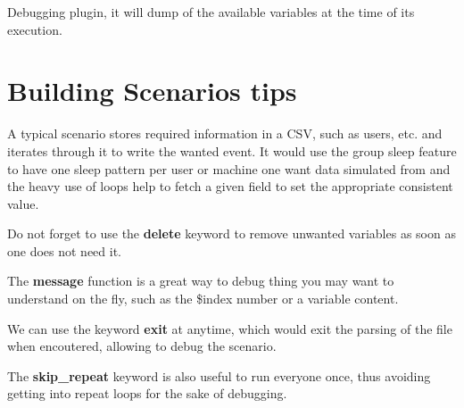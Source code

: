 \documentclass[10pt]{article}
\begin{document}
Debugging plugin, it will dump of the available variables at the time of its execution.


\section{Building Scenarios tips}

A typical scenario stores required information in a CSV, such as users, etc. and iterates through it to write the wanted event. It would use the group sleep feature to have one sleep pattern per user or machine one want data simulated from and the heavy use of loops help to fetch a given field to set the appropriate consistent value.

Do not forget to use the \textbf{delete} keyword to remove unwanted variables as soon as one does not need it.

The \textbf{message} function is a great way to debug thing you may want to understand on the fly, such as the \$index number or a variable content.

We can use the keyword \textbf{exit} at anytime, which would exit the parsing of the file when encoutered, allowing to debug the scenario.

The \textbf{skip\_repeat} keyword is also useful to run everyone once, thus avoiding getting into repeat loops for the sake of debugging.
\end{document}
